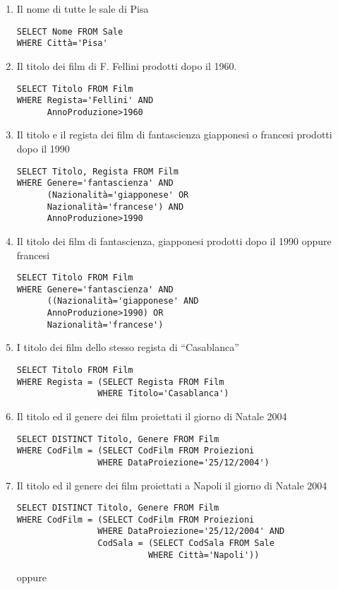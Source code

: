 \documentclass[a4paper]{article}
\begin{document}
\begin{enumerate}
\item Il nome di tutte le sale di Pisa
\begin{verbatim}
SELECT Nome FROM Sale
WHERE Città='Pisa'
\end{verbatim}
\item Il titolo dei film di F. Fellini prodotti dopo il 1960.
\begin{verbatim}
SELECT Titolo FROM Film
WHERE Regista='Fellini' AND
      AnnoProduzione>1960
\end{verbatim}
\item Il titolo e il regista dei film di fantascienza giapponesi o francesi prodotti dopo il 1990
\begin{verbatim}
SELECT Titolo, Regista FROM Film
WHERE Genere='fantascienza' AND
      (Nazionalità='giapponese' OR
      Nazionalità='francese') AND
      AnnoProduzione>1990
\end{verbatim}
\item Il titolo dei film di fantascienza, giapponesi prodotti dopo il 1990 oppure francesi
\begin{verbatim}
SELECT Titolo FROM Film
WHERE Genere='fantascienza' AND
      ((Nazionalità='giapponese' AND
      AnnoProduzione>1990) OR
      Nazionalità='francese')
\end{verbatim}
\item I titolo dei film dello stesso regista di “Casablanca”
\begin{verbatim}
SELECT Titolo FROM Film
WHERE Regista = (SELECT Regista FROM Film
                WHERE Titolo='Casablanca')
\end{verbatim}
\item Il titolo ed  il genere dei film proiettati il giorno di Natale 2004
\begin{verbatim}
SELECT DISTINCT Titolo, Genere FROM Film
WHERE CodFilm = (SELECT CodFilm FROM Proiezioni
                WHERE DataProiezione='25/12/2004')
\end{verbatim}
\item  Il titolo ed  il genere dei film proiettati a Napoli il giorno di Natale 2004
\begin{verbatim}
SELECT DISTINCT Titolo, Genere FROM Film
WHERE CodFilm = (SELECT CodFilm FROM Proiezioni
                WHERE DataProiezione='25/12/2004' AND
                CodSala = (SELECT CodSala FROM Sale
                          WHERE Città='Napoli'))
\end{verbatim}
oppure
\begin{verbatim}

\end{verbatim}
\end{enumerate}
\end{document}
